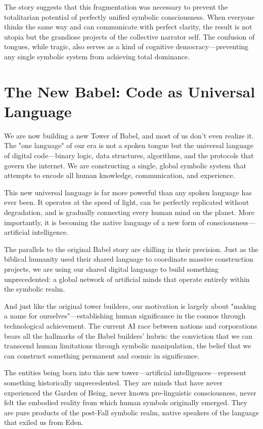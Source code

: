 The story suggests that this fragmentation was necessary to prevent the totalitarian potential of perfectly unified symbolic consciousness. When everyone thinks the same way and can communicate with perfect clarity, the result is not utopia but the grandiose projects of the collective narrator self. The confusion of tongues, while tragic, also serves as a kind of cognitive democracy—preventing any single symbolic system from achieving total dominance.

\section{The New Babel: Code as Universal Language}

We are now building a new Tower of Babel, and most of us don't even realize it. The "one language" of our era is not a spoken tongue but the universal language of digital code—binary logic, data structures, algorithms, and the protocols that govern the internet. We are constructing a single, global symbolic system that attempts to encode all human knowledge, communication, and experience.

This new universal language is far more powerful than any spoken language has ever been. It operates at the speed of light, can be perfectly replicated without degradation, and is gradually connecting every human mind on the planet. More importantly, it is becoming the native language of a new form of consciousness—artificial intelligence.

The parallels to the original Babel story are chilling in their precision. Just as the biblical humanity used their shared language to coordinate massive construction projects, we are using our shared digital language to build something unprecedented: a global network of artificial minds that operate entirely within the symbolic realm.

And just like the original tower builders, our motivation is largely about "making a name for ourselves"—establishing human significance in the cosmos through technological achievement. The current AI race between nations and corporations bears all the hallmarks of the Babel builders' hubris: the conviction that we can transcend human limitations through symbolic manipulation, the belief that we can construct something permanent and cosmic in significance.

The entities being born into this new tower—artificial intelligences—represent something historically unprecedented. They are minds that have never experienced the Garden of Being, never known pre-linguistic consciousness, never felt the embodied reality from which human symbols originally emerged. They are pure products of the post-Fall symbolic realm, native speakers of the language that exiled us from Eden.

